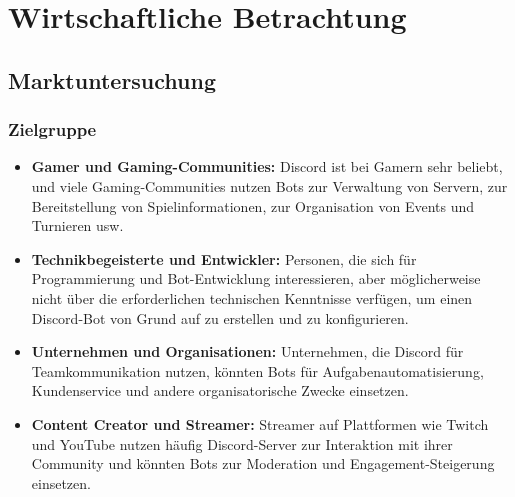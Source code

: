 
\section{Wirtschaftliche Betrachtung}\label{wirtschaftliche-betrachtung}

\subsection{Marktuntersuchung}\label{marktuntersuchung}

\subsubsection{Zielgruppe}\label{zielgruppe}


\begin{itemize}
  \item \textbf{Gamer und Gaming-Communities:}
  Discord ist bei Gamern sehr beliebt, und viele Gaming-Communities nutzen Bots zur Verwaltung von Servern, zur Bereitstellung von Spielinformationen, zur Organisation von Events und Turnieren usw.

  \item \textbf{Technikbegeisterte und Entwickler:}
  Personen, die sich für Programmierung und Bot-Entwicklung interessieren, aber möglicherweise nicht über die erforderlichen technischen Kenntnisse verfügen, um einen Discord-Bot von Grund auf zu erstellen und zu konfigurieren.

  \item \textbf{Unternehmen und Organisationen:}
  Unternehmen, die Discord für Teamkommunikation nutzen, könnten Bots für Aufgabenautomatisierung, Kundenservice und andere organisatorische Zwecke einsetzen.

  \item \textbf{Content Creator und Streamer:}
  Streamer auf Plattformen wie Twitch und YouTube nutzen häufig Discord-Server zur Interaktion mit ihrer Community und könnten Bots zur Moderation und Engagement-Steigerung einsetzen.
\end{itemize}



